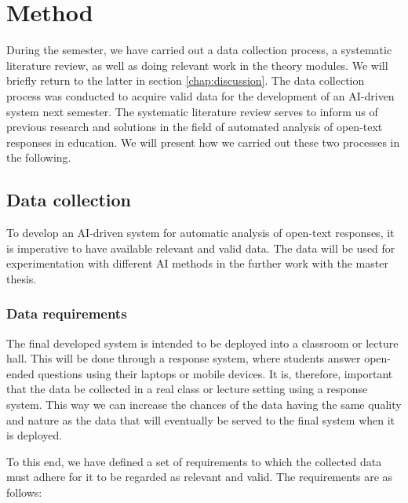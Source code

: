 \chapter{Method}\label{chap:method}

\begin{comment}
The method chapter should describe in detail which activities you undertake to answer the research questions presented in the introduction, and why they were chosen. This includes detailed descriptions of experiments, surveys, computations, data analysis, statistical tests etc.

Talk about the data used, and why we collected our own
\end{comment}

During the semester, we have carried out a data collection process, a systematic literature review, as well as doing relevant work in the theory modules. We will briefly return to the latter in section \ref{chap:discussion}. The data collection process was conducted to acquire valid data for the development of an AI-driven system next semester. The systematic literature review serves to inform us of previous research and solutions in the field of automated analysis of open-text responses in education. We will present how we carried out these two processes in the following.


\section{Data collection}
To develop an AI-driven system for automatic analysis of open-text responses, it is imperative to have available relevant and valid data. The data will be used for experimentation with different AI methods in the further work with the master thesis.

\subsection{Data requirements}
The final developed system is intended to be deployed into a classroom or lecture hall. This will be done through a response system, where students answer open-ended questions using their laptops or mobile devices. It is, therefore, important that the data be collected in a real class or lecture setting using a response system. This way we can increase the chances of the data having the same quality and nature as the data that will eventually be served to the final system when it is deployed.

To this end, we have defined a set of requirements to which the collected data must adhere for it to be regarded as relevant and valid. The requirements are as follows:

